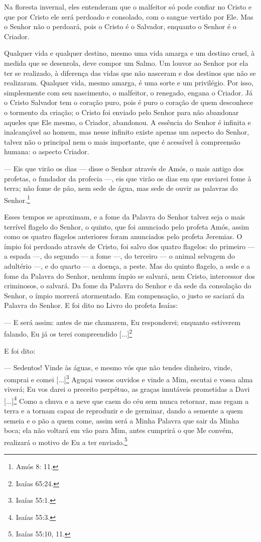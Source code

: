 Na floresta invernal, eles entenderam que o malfeitor só pode confiar no
Cristo e que por Cristo ele será perdoado e consolado, com o sangue
vertido por Ele. Mas o Senhor não o perdoará, pois o Cristo é o
Salvador, enquanto o Senhor é o Criador.

Qualquer vida e qualquer destino, mesmo uma vida amarga e um destino
cruel, à medida que se desenrola, deve compor um Salmo. Um louvor ao
Senhor por ela ter se realizado, à diferença das vidas que não nasceram
e dos destinos que não se realizaram. Qualquer vida, mesmo amarga, é uma
sorte e um privilégio. Por isso, simplesmente com seu nascimento, o
malfeitor, o renegado, engana o Criador. Já o Cristo Salvador tem o
coração puro, pois é puro o coração de quem desconhece o tormento da
criação; o Cristo foi enviado pelo Senhor para não abandonar aqueles que
Ele mesmo, o Criador, abandonou. A essência do Senhor é infinita e
inalcançável ao homem, mas nesse infinito existe apenas um aspecto do
Senhor, talvez não o principal nem o mais importante, que é acessível à
compreensão humana: o aspecto Criador.

--- Eis que virão os dias --- disse o Senhor através de Amós, o mais
antigo dos profetas, o fundador da profecia ---, eis que virão os dias
em que enviarei fome à terra; não fome de pão, nem sede de água, mas
sede de ouvir as palavras do Senhor.\footnote{Amós 8: 11.}

Esses tempos se aproximam, e a fome da Palavra do Senhor talvez seja o
mais terrível flagelo do Senhor, o quinto, que foi anunciado pelo
profeta Amós, assim como os quatro flagelos anteriores foram anunciados
pelo profeta Jeremias. O ímpio foi perdoado através de Cristo, foi salvo
dos quatro flagelos: do primeiro --- a espada ---, do segundo --- a fome
---, do terceiro --- o animal selvagem do adultério ---, e do quarto ---
a doença, a peste. Mas do quinto flagelo, a sede e a fome da Palavra do
Senhor, nenhum ímpio se salvará, nem Cristo, intercessor dos criminosos,
o salvará. Da fome da Palavra do Senhor e da sede da consolação do
Senhor, o ímpio morrerá atormentado. Em compensação, o justo se saciará
da Palavra do Senhor. E foi dito no Livro do profeta Isaías:

--- E será assim: antes de me chamarem, Eu responderei; enquanto
estiverem falando, Eu já os terei compreendido {[}...{]}\footnote{Isaías
  65:24.}

E foi dito:

--- Sedentos! Vinde às águas, e mesmo vós que não tendes dinheiro,
vinde, comprai e comei {[}...{]}\footnote{Isaías 55:1.} Aguçai vossos
ouvidos e vinde a Mim, escutai e vossa alma viverá; Eu vos darei o
preceito perpétuo, as graças imutáveis prometidas a Davi
{[}...{]}\footnote{Isaías 55:3.} Como a chuva e a neve que caem do céu
sem nunca retornar, mas regam a terra e a tornam capaz de reproduzir e
de germinar, dando a semente a quem semeia e o pão a quem come, assim
será a Minha Palavra que sair da Minha boca; ela não voltará em vão para
Mim, antes cumprirá o que Me convém, realizará o motivo de Eu a ter
enviado.\footnote{Isaías 55:10, 11.}

